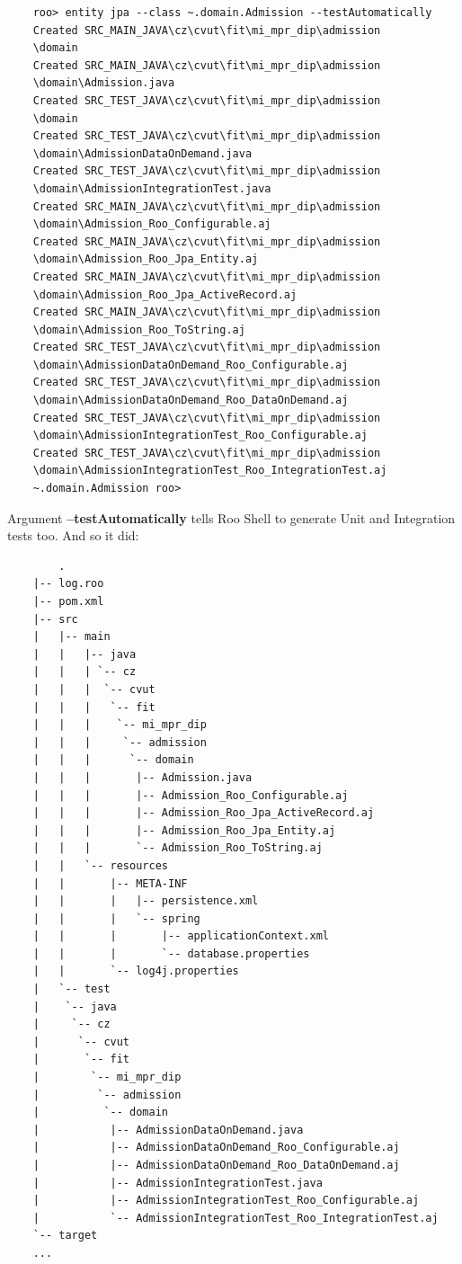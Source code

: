 	\begin{verbatim}
	roo> entity jpa --class ~.domain.Admission --testAutomatically
	Created SRC_MAIN_JAVA\cz\cvut\fit\mi_mpr_dip\admission
	\domain
	Created SRC_MAIN_JAVA\cz\cvut\fit\mi_mpr_dip\admission
	\domain\Admission.java
	Created SRC_TEST_JAVA\cz\cvut\fit\mi_mpr_dip\admission
	\domain
	Created SRC_TEST_JAVA\cz\cvut\fit\mi_mpr_dip\admission
	\domain\AdmissionDataOnDemand.java
	Created SRC_TEST_JAVA\cz\cvut\fit\mi_mpr_dip\admission
	\domain\AdmissionIntegrationTest.java
	Created SRC_MAIN_JAVA\cz\cvut\fit\mi_mpr_dip\admission
	\domain\Admission_Roo_Configurable.aj
	Created SRC_MAIN_JAVA\cz\cvut\fit\mi_mpr_dip\admission
	\domain\Admission_Roo_Jpa_Entity.aj
	Created SRC_MAIN_JAVA\cz\cvut\fit\mi_mpr_dip\admission
	\domain\Admission_Roo_Jpa_ActiveRecord.aj
	Created SRC_MAIN_JAVA\cz\cvut\fit\mi_mpr_dip\admission
	\domain\Admission_Roo_ToString.aj
	Created SRC_TEST_JAVA\cz\cvut\fit\mi_mpr_dip\admission
	\domain\AdmissionDataOnDemand_Roo_Configurable.aj
	Created SRC_TEST_JAVA\cz\cvut\fit\mi_mpr_dip\admission
	\domain\AdmissionDataOnDemand_Roo_DataOnDemand.aj
	Created SRC_TEST_JAVA\cz\cvut\fit\mi_mpr_dip\admission
	\domain\AdmissionIntegrationTest_Roo_Configurable.aj
	Created SRC_TEST_JAVA\cz\cvut\fit\mi_mpr_dip\admission
	\domain\AdmissionIntegrationTest_Roo_IntegrationTest.aj
	~.domain.Admission roo>
	\end{verbatim}
	
	Argument \textbf{--testAutomatically} tells Roo Shell to generate Unit and Integration tests too. And so it did:
	
	\begin{verbatim}
		.
	|-- log.roo
	|-- pom.xml
	|-- src
	|   |-- main
	|   |   |-- java
	|   |   | `-- cz
	|   |   |  `-- cvut
	|   |   |   `-- fit
	|   |   |    `-- mi_mpr_dip
	|   |   |     `-- admission
	|   |   |      `-- domain
	|   |   |       |-- Admission.java
	|   |   |       |-- Admission_Roo_Configurable.aj
	|   |   |       |-- Admission_Roo_Jpa_ActiveRecord.aj
	|   |   |       |-- Admission_Roo_Jpa_Entity.aj
	|   |   |       `-- Admission_Roo_ToString.aj
	|   |   `-- resources
	|   |       |-- META-INF
	|   |       |   |-- persistence.xml
	|   |       |   `-- spring
	|   |       |       |-- applicationContext.xml
	|   |       |       `-- database.properties
	|   |       `-- log4j.properties
	|   `-- test
	|    `-- java
	|     `-- cz
	|      `-- cvut
	|       `-- fit
	|        `-- mi_mpr_dip
	|         `-- admission
	|          `-- domain
	|           |-- AdmissionDataOnDemand.java
	|           |-- AdmissionDataOnDemand_Roo_Configurable.aj
	|           |-- AdmissionDataOnDemand_Roo_DataOnDemand.aj
	|           |-- AdmissionIntegrationTest.java
	|           |-- AdmissionIntegrationTest_Roo_Configurable.aj
	|           `-- AdmissionIntegrationTest_Roo_IntegrationTest.aj
	`-- target
	...
	\end{verbatim}
	

